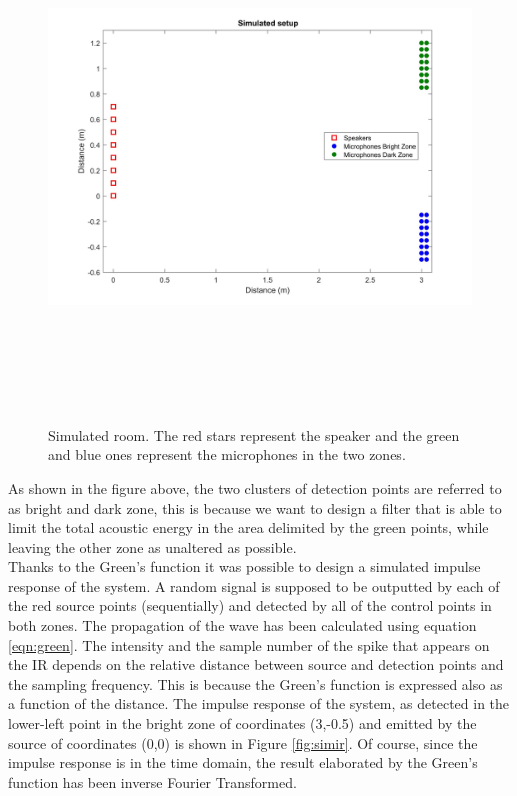 \begin{figure}[H]
\centering
\includegraphics[width=14cm,height=14cm,keepaspectratio]{Figures/simroom}
\decoRule
\caption[Simulated room]{Simulated room. The red stars represent the speaker and the green and blue ones represent the microphones in the two zones.}
\label{fig:simroom}
\end{figure}

As shown in the figure above, the two clusters of detection points are referred to as bright and dark zone, this is because we want to design a filter that is able to limit the total acoustic energy in the area delimited by the green points, while leaving the other zone as unaltered as possible.
\\
Thanks to the Green's function it was possible to design a simulated impulse response of the system. A random signal is supposed to be outputted by each of the red source points (sequentially) and detected by all of the control points in both zones. The propagation of the wave has been calculated using equation \ref{eqn:green}. The intensity and the sample number of the spike that appears on the IR depends on the relative distance between source and detection points and the sampling frequency. This is because the Green's function is expressed also as a function of the distance. The impulse response of the system, as detected in the lower-left point in the bright zone of coordinates (3,-0.5) and emitted by the source of coordinates (0,0) is shown in Figure \ref{fig:simir}. Of course, since the impulse response is in the time domain, the result elaborated by the Green's function has been inverse Fourier Transformed.

